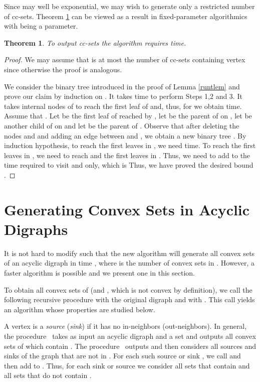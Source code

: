 \documentclass[11pt]{article}
\newcommand{\2}{\vspace{0.2 cm}}
\newtheorem{theorem}{Theorem}[section]
\newcommand\cs{{}}
\begin{document}
\2

Since  may well be exponential, we may wish to generate only
a restricted number  of cc-sets. Theorem \ref{kccsets} can be
viewed as a result in fixed-parameter algorithmics \cite{downey1999}
with  being a parameter.

\begin{theorem}\label{kccsets}
To output  cc-sets the algorithm  requires 
time.
\end{theorem}
\begin{proof} We may assume that  is at most the number
of cc-sets containing vertex  since otherwise the proof is
analogous.

We consider the binary tree  introduced in the proof of Lemma
\ref{runtlem} and prove our claim by induction on . It takes
 time to perform Steps 1,2 and 3. It takes  internal
nodes of  to reach the first leaf of  and, thus, for  we
obtain  time. Assume that . Let  be the first
leaf of  reached by , let  be the parent of  on
, let  be another child of  on  and let  be the
parent of . Observe that after deleting the nodes  and  and
adding an edge between  and , we obtain a new binary tree
. By induction hypothesis, to reach the first  leaves in
, we need  time. To reach the first  leaves in
, we need to reach  and the first  leaves in . Thus,
we need to add to  the time required to visit  and
 only, which is  Thus, we have proved the desired bound
.
\end{proof}





\section{Generating Convex Sets in Acyclic Digraphs}\label{all}

It is not hard to modify  such that the new algorithm will
generate all convex sets of an acyclic digraph  in time , where  is the number of convex sets in . However,
a faster algorithm is possible and we present one in this section.

To obtain all convex sets of  (and , which is not
convex by definition), we call the following recursive procedure
with the original digraph  and with . This call
yields an algorithm whose properties are studied below.

A vertex  is a {\em source} ({\em sink}) if it has no in-neighbors (out-neighbors).
In general, the procedure {\cs}\  takes as input an acyclic digraph
 and a set  and outputs all convex sets of 
which contain .  The procedure {\cs}\ outputs  and then
considers all sources and sinks of the graph that are not in . 
For each such source or sink , we call {\cs} and then
add  to . Thus, for each sink or source 
we consider all sets that contain  and all sets that do not
contain .
\end{document}
